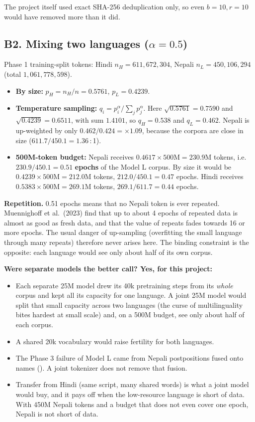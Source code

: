 The project itself used exact SHA-256 deduplication only, so even $b=10,r=10$ would have removed more than it did.

\subsection*{B2. Mixing two languages ($\alpha=0.5$)}
Phase 1 training-split tokens: Hindi $n_H=611{,}672{,}304$, Nepali $n_L=450{,}106{,}294$ (total $1{,}061{,}778{,}598$).
\begin{itemize}[leftmargin=*,nosep]
\item \textbf{By size:} $p_H=n_H/n=0.5761$, $p_L=0.4239$.
\item \textbf{Temperature sampling:} $q_i=p_i^{\alpha}/\sum_j p_j^{\alpha}$. Here $\sqrt{0.5761}=0.7590$ and $\sqrt{0.4239}=0.6511$, with sum $1.4101$, so $q_H=\mathbf{0.538}$ and $q_L=\mathbf{0.462}$. Nepali is up-weighted by only $0.462/0.424=\times1.09$, because the corpora are close in size ($611.7/450.1=1.36$\,:\,1).
\item \textbf{500M-token budget:} Nepali receives $0.4617\times500\text{M}=230.9$M tokens, i.e. $230.9/450.1=\mathbf{0.51}$ \textbf{epochs} of the Model L corpus. By size it would be $0.4239\times500\text{M}=212.0$M tokens, $212.0/450.1=0.47$ epochs. Hindi receives $0.5383\times500\text{M}=269.1$M tokens, $269.1/611.7=0.44$ epochs.
\end{itemize}
\textbf{Repetition.} 0.51 epochs means that no Nepali token is ever repeated. Muennighoff et al.\ (2023) find that up to about 4 epochs of repeated data is almost as good as fresh data, and that the value of repeats fades towards 16 or more epochs. The usual danger of up-sampling (overfitting the small language through many repeats) therefore never arises here. The binding constraint is the opposite: each language would see only about half of its own corpus.

\textbf{Were separate models the better call? Yes, for this project:}
\begin{itemize}[leftmargin=*,nosep]
\item Each separate 25M model drew its 40k pretraining steps from its \emph{whole} corpus and kept all its capacity for one language. A joint 25M model would split that small capacity across two languages (the curse of multilinguality bites hardest at small scale) and, on a 500M budget, see only about half of each corpus.
\item A shared 20k vocabulary would raise fertility for both languages.
\item The Phase 3 failure of Model L came from Nepali postpositions fused onto names (). A joint tokenizer does not remove that fusion.
\item Transfer from Hindi (same script, many shared words) is what a joint model would buy, and it pays off when the low-resource language is short of data. With 450M Nepali tokens and a budget that does not even cover one epoch, Nepali is not short of data.
\end{itemize}

